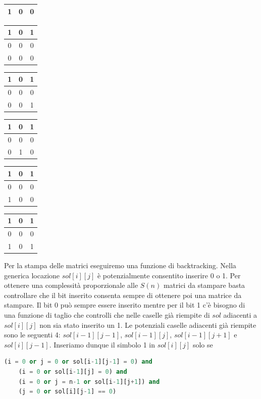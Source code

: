 \begin{center}
\begin{tabular}{|c|c|c|}
     1&0&0\\\hline
\end{tabular}\hspace{0.3cm}
\begin{tabular}{|c|c|c|}
     \hline
     1&0&1\\\hline
     0&0&0\\\hline
     0&0&0\\\hline
\end{tabular}\hspace{0.3cm}
\begin{tabular}{|c|c|c|}
     \hline
     1&0&1\\\hline
     0&0&0\\\hline
     0&0&1\\\hline
\end{tabular}\hspace{0.3cm}
\begin{tabular}{|c|c|c|}
     \hline
     1&0&1\\\hline
     0&0&0\\\hline
     0&1&0\\\hline
\end{tabular}\hspace{0.3cm}
\begin{tabular}{|c|c|c|}
     \hline
     1&0&1\\\hline
     0&0&0\\\hline
     1&0&0\\\hline
\end{tabular}\hspace{0.3cm}
\begin{tabular}{|c|c|c|}
     \hline
     1&0&1\\\hline
     0&0&0\\\hline
     1&0&1\\\hline
\end{tabular}
\end{center}

Per la stampa delle matrici eseguiremo una funzione di backtracking. Nella generica locazione $sol[i][j]$ è potenzialmente consentito inserire 0 o 1. Per ottenere una complessità proporzionale alle $S(n)$ matrici da stampare basta controllare che il bit inserito consenta sempre di ottenere poi una matrice da stampare. Il bit 0 può sempre essere inserito mentre per il bit 1 c’è bisogno di una funzione di taglio che controlli che nelle caselle già riempite di $sol$ adiacenti a $sol[i][j]$ non sia stato inserito un 1. Le potenziali caselle adiacenti già riempite sono le seguenti 4: $sol[i-1][j-1]$, $sol[i-1][j]$, $sol[i - 1][j + 1]$ e $sol[i][j - 1]$. Inseriamo dunque il simbolo 1 in $sol[i][j]$ solo se 
\begin{lstlisting}[language=Python]
    (i = 0 or j = 0 or sol[i-1][j-1] = 0) and
    (i = 0 or sol[i-1][j] = 0) and
    (i = 0 or j = n-1 or sol[i-1][j+1]) and
    (j = 0 or sol[i][j-1] == 0)    
\end{lstlisting}

